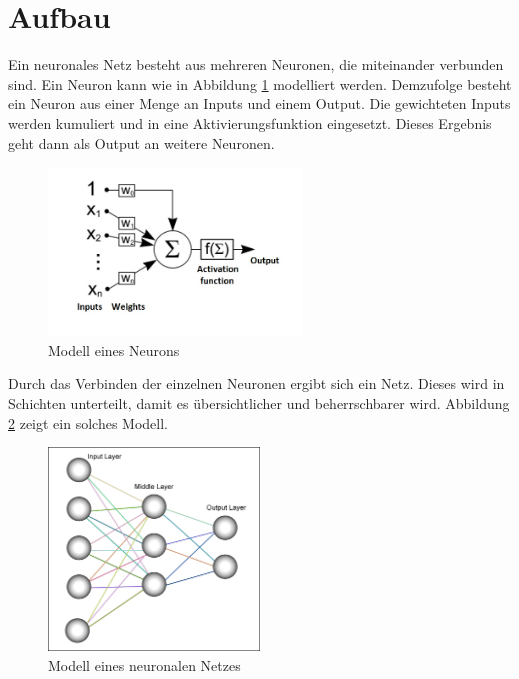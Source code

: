 
\section{Aufbau}
Ein neuronales Netz besteht aus mehreren Neuronen, die miteinander verbunden sind. Ein Neuron kann wie in Abbildung \ref{neuron} modelliert werden. Demzufolge besteht ein Neuron aus einer Menge an Inputs und einem Output. Die gewichteten Inputs werden kumuliert und in eine Aktivierungsfunktion eingesetzt. Dieses Ergebnis geht dann als Output an weitere Neuronen. 
\begin{figure}[h]
\centering
\includegraphics[width=0.6\textwidth]{pictures/neuron.jpg}
\caption{Modell eines Neurons \cite{bib:neuron}}
\label{neuron}
\end{figure}

Durch das Verbinden der einzelnen Neuronen ergibt sich ein Netz. Dieses wird in Schichten unterteilt, damit es übersichtlicher und beherrschbarer wird. Abbildung \ref{network} zeigt ein solches Modell.
\begin{figure}[h]
\centering
\includegraphics[width=0.5\textwidth]{pictures/neural-network.png}
\caption{Modell eines neuronalen Netzes \cite{bib:neuron}}
\label{network}
\end{figure}

